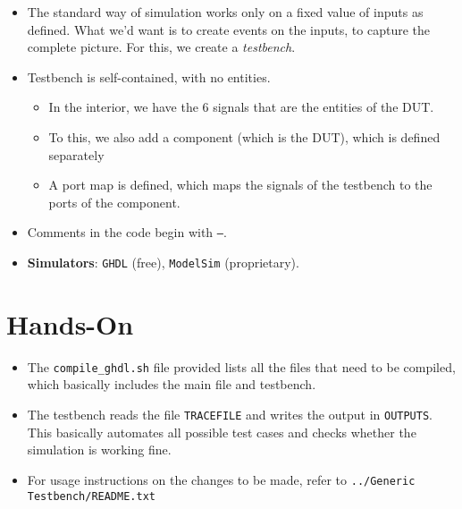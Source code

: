 \documentclass[a4paper]{article}
\begin{document}
\begin{itemize}
\begin{itemize}
	\end{itemize}
	\item The standard way of simulation works only on a fixed value of inputs as defined. What we'd want is to create events on the inputs, to capture the complete picture. For this, we create a {\em testbench}.
	\item Testbench is self-contained, with no entities.
	\begin{itemize}
		\item In the interior, we have the 6 signals that are the entities of the DUT.
		\item To this, we also add a component (which is the DUT), which is defined separately
		\item A port map is defined, which maps the signals of the testbench to the ports of the component.
\end{itemize}		
	\item Comments in the code begin with \texttt{--}.
	\item {\bf Simulators}: \texttt{GHDL} (free), \texttt{ModelSim} (proprietary).
\end{itemize}

\section*{Hands-On}
\begin{itemize}
	\item The \texttt{compile\_ghdl.sh} file provided lists all the files that need to be compiled, which basically includes the main file and testbench.
	\item The testbench reads the file \texttt{TRACEFILE} and writes the output in \texttt{OUTPUTS}. This basically automates all possible test cases and checks whether the simulation is working fine.
	\item For usage instructions on the changes to be made, refer to \texttt{../Generic Testbench/README.txt}
\end{itemize}
\end{document}

